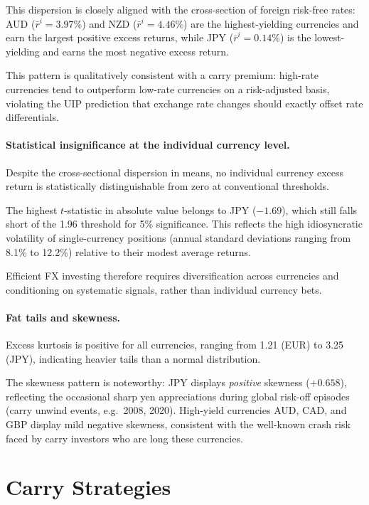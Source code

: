 \documentclass[a4paper,12pt]{article}
\begin{document}
This dispersion is closely aligned with the cross-section of foreign risk-free rates: AUD
($\bar{r}^i = 3.97\%$) and NZD ($\bar{r}^i = 4.46\%$) are the highest-yielding currencies
and earn the largest positive excess returns, while JPY ($\bar{r}^i = 0.14\%$) is the
lowest-yielding and earns the most negative excess return.

This pattern is qualitatively consistent with a carry premium: high-rate currencies tend
to outperform low-rate currencies on a risk-adjusted basis, violating the UIP prediction
that exchange rate changes should exactly offset rate differentials.

\paragraph{Statistical insignificance at the individual currency level.}
Despite the cross-sectional dispersion in means, no individual currency excess return is
statistically distinguishable from zero at conventional thresholds.

The highest $t$-statistic in absolute value belongs to JPY ($-1.69$), which still falls
short of the 1.96 threshold for 5\% significance. This reflects the high idiosyncratic
volatility of single-currency positions (annual standard deviations ranging from 8.1\% to
12.2\%) relative to their modest average returns.

Efficient FX investing therefore requires diversification across currencies and conditioning
on systematic signals, rather than individual currency bets.

\paragraph{Fat tails and skewness.}
Excess kurtosis is positive for all currencies, ranging from 1.21 (EUR) to 3.25 (JPY),
indicating heavier tails than a normal distribution.

The skewness pattern is noteworthy: JPY displays \emph{positive} skewness ($+0.658$),
reflecting the occasional sharp yen appreciations during global risk-off episodes (carry
unwind events, e.g.\ 2008, 2020). High-yield currencies AUD, CAD, and GBP display mild
negative skewness, consistent with the well-known crash risk faced by carry investors who
are long these currencies.

\section{Carry Strategies}
\label{sec:carry}
\end{document}
